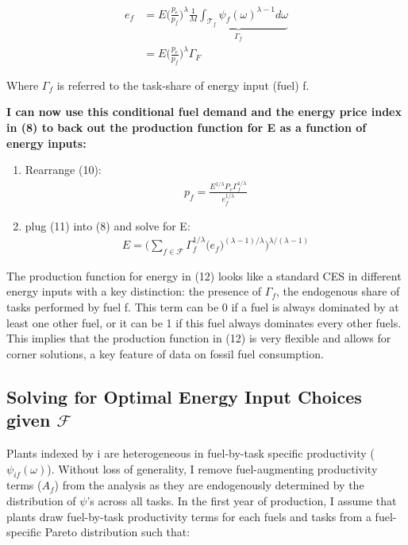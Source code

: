 \documentclass{article}
\begin{document}
\begin{align}
    e_f &= E \Big( \frac{p_e}{p_f} \Big)^{\lambda} \underbrace{ \frac{1}{M} \int_{\mathcal{T}_f} \psi_f(\omega)^{\lambda-1} d\omega}_{\Gamma_f} \\
    &= E \Big( \frac{p_e}{p_f} \Big)^{\lambda} \Gamma_F
\end{align}

Where $\Gamma_f$ is referred to the task-share of energy input (fuel) f.

\textbf{I can now use this conditional fuel demand and the energy price index in (8) to back out the production function for E as a function of energy inputs:}

\begin{enumerate}
    \item Rearrange (10):
    \begin{align}
        p_f = \frac{E^{1/\lambda} P_e \Gamma_f^{1/\lambda}}  {e_f^{1/\lambda}}
    \end{align}
    \item plug (11) into (8) and solve for E:
    \begin{align}
        E = \Bigg( \sum_{f \in \mathcal{F}} \Gamma_f^{1/\lambda} \big( e_f \big)^{(\lambda-1)/\lambda} \Bigg)^{\lambda/(\lambda-1)}
    \end{align}
\end{enumerate}

The production function for energy in (12) looks like a standard CES in different energy inputs with a key distinction: the presence of $\Gamma_f$, the endogenous share of tasks performed by fuel f. This term can be 0 if a fuel is always dominated by at least one other fuel, or it can be 1 if this fuel always dominates every other fuels. This implies that the production function in (12) is very flexible and allows for corner solutions, a key feature of data on fossil fuel consumption.


\subsection{Solving for Optimal Energy Input Choices given $\mathcal{F}$}

Plants indexed by i are heterogeneous in fuel-by-task specific productivity ($\psi_{if}(\omega)$). Without loss of generality, I remove fuel-augmenting productivity terms ($A_f$) from the analysis as they are endogenously determined by the distribution of $\psi$'s across all tasks. In the first year of production, I assume that plants draw fuel-by-task productivity terms for each fuels and tasks from a fuel-specific Pareto distribution such that:
\end{document}
